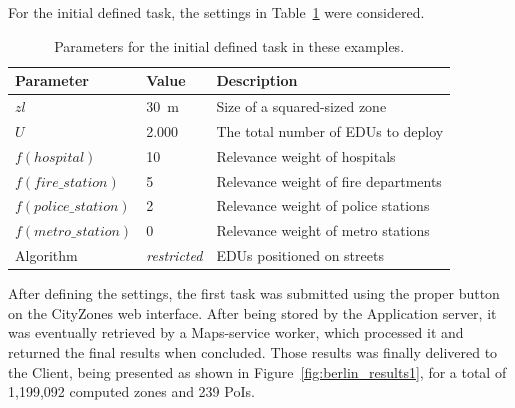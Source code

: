 \begin{refsection}
For the initial defined task, the settings in Table~\ref{tab:example_parameters} were considered.

\begin{table}[htbp!]
  \centering
  \caption{Parameters for the initial defined task in these examples.}\label{tab:example_parameters}
  \begin{tabular}{llp{7.3cm}}
    \hline
    \textbf{Parameter}   & \textbf{Value}      & \textbf{Description} \\
    \hline
    $zl$                 & 30~m                & Size of a squared-sized zone \\
    $U$                  & 2.000               & The total number of EDUs to deploy \\
    $f(hospital)$        & 10                  & Relevance weight of hospitals \\
    $f(fire\_station)$   & 5                   & Relevance weight of fire departments \\
    $f(police\_station)$ & 2                   & Relevance weight of police stations  \\
    $f(metro\_station)$  & 0                   & Relevance weight of metro stations  \\
    Algorithm            & \textit{restricted} & EDUs positioned on streets \\
    \hline
  \end{tabular}
\end{table}

After defining the settings, the first task was submitted using the proper button on the CityZones web interface. After being stored by the Application server, it was eventually retrieved by a Maps-service worker, which processed it and returned the final results when concluded. Those results was finally delivered to the Client, being presented as shown in Figure~\ref{fig:berlin_results1}, for a total of 1,199,092 computed zones and 239 PoIs. 


\end{refsection}
